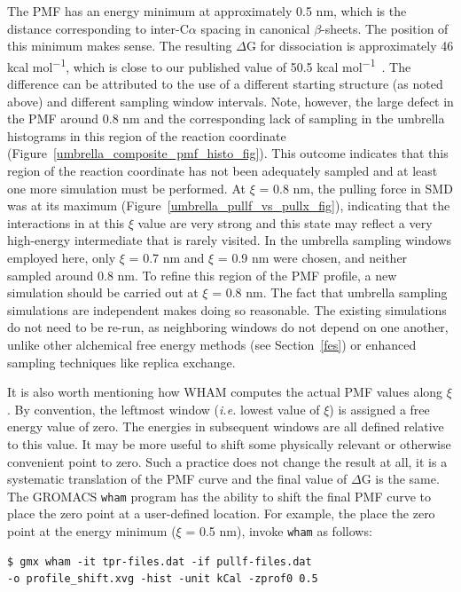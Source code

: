 \documentclass[9pt,tutorial]{livecoms}
\begin{document}
The PMF has an energy minimum at approximately 0.5 nm, which is the distance corresponding to inter-C$\alpha$ spacing in canonical $\beta$-sheets. The position of this minimum makes sense. The resulting $\Delta$G for dissociation is approximately 46 kcal mol\textsuperscript{$-$1}, which is close to our published value of 50.5 kcal mol\textsuperscript{$-$1}~\cite{Lemkul2010}. The difference can be attributed to the use of a different starting structure (as noted above) and different sampling window intervals. Note, however, the large defect in the PMF around 0.8 nm and the corresponding lack of sampling in the umbrella histograms in this region of the reaction coordinate (Figure~\ref{umbrella_composite_pmf_histo_fig}). This outcome indicates that this region of the reaction coordinate has not been adequately sampled and at least one more simulation must be performed. At $\xi$ = 0.8 nm, the pulling force in SMD was at its maximum (Figure~\ref{umbrella_pullf_vs_pullx_fig}), indicating that the interactions in at this $\xi$ value are very strong and this state may reflect a very high-energy intermediate that is rarely visited. In the umbrella sampling windows employed here, only $\xi$ = 0.7 nm and $\xi$ = 0.9 nm were chosen, and neither sampled around 0.8 nm. To refine this region of the PMF profile, a new simulation should be carried out at $\xi$ = 0.8 nm. The fact that umbrella sampling simulations are independent makes doing so reasonable. The existing simulations do not need to be re-run, as neighboring windows do not depend on one another, unlike other alchemical free energy methods (see Section~\ref{fes}) or enhanced sampling techniques like replica exchange.

It is also worth mentioning how WHAM computes the actual PMF values along $\xi$. By convention, the leftmost window ({\em i.e.} lowest value of $\xi$) is assigned a free energy value of zero. The energies in subsequent windows are all defined relative to this value. It may be more useful to shift some physically relevant or otherwise convenient point to zero. Such a practice does not change the result at all, it is a systematic translation of the PMF curve and the final value of $\Delta$G is the same. The GROMACS \texttt{wham} program has the ability to shift the final PMF curve to place the zero point at a user-defined location. For example, the place the zero point at the energy minimum ($\xi$ = 0.5 nm), invoke \texttt{wham} as follows:

\begin{verbatim}
$ gmx wham -it tpr-files.dat -if pullf-files.dat 
-o profile_shift.xvg -hist -unit kCal -zprof0 0.5
\end{verbatim}
\end{document}
